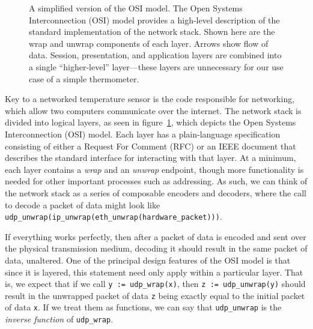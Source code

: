 \documentclass[twoside]{memoir}
\begin{document}
\begin{figure}[h]
    
    \caption{A simplified version of the OSI model.
    The Open Systems Interconnection (OSI) model provides a high-level description of the standard
implementation of the network stack.
Shown here are the wrap and unwrap components of each layer. Arrows show flow of data. Session, presentation, and application layers are combined into a single ``higher-level'' layer---these layers are unnecessary for our use case of a simple thermometer.}
    \label{fig:network-stack}
\end{figure}
Key to a networked temperature sensor is the code responsible for networking,
which allow two computers communicate over the internet.
The network stack is divided into logical layers, as seen in figure~\ref{fig:network-stack}, which depicts the Open Systems Interconnection (OSI) model.
Each layer has a plain-language specification
consisting of either a Request For Comment (RFC) or an IEEE document
that describes the standard interface for interacting with that layer.
At a minimum, each layer contains a \textit{wrap} and an \textit{unwrap}
endpoint, though more functionality is needed for other important processes such as
addressing.
As such, we can think of the network stack as a series of composable
encoders and decoders,
where the call to decode a packet of data might look like
\lstinline{udp_unwrap(ip_unwrap(eth_unwrap(hardware_packet)))}.


If everything works perfectly, then after a packet of data is encoded
and sent over the physical transmission medium, decoding it should
result in the same packet of data, unaltered.
One of the principal design features of the OSI model is that since
it is layered, this statement need only apply within a particular layer.
That is, we expect that if we call
\lstinline{y := udp_wrap(x)}, then \lstinline{z := udp_unwrap(y)} should
result in the unwrapped packet of data \lstinline{z} being exactly equal to
the initial packet of data \lstinline{x}.
If we treat them as functions, we can say that \lstinline{udp_unwrap} is 
the \textit{inverse function} of \lstinline{udp_wrap}.
\end{document}
